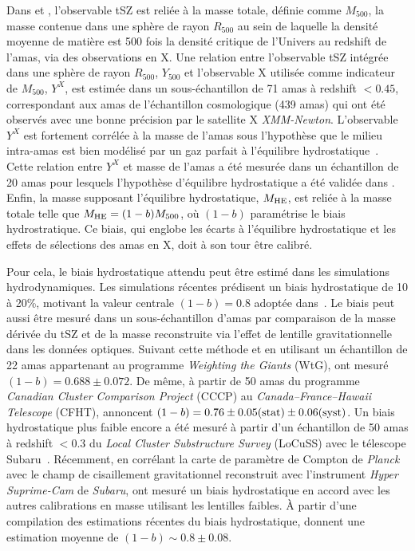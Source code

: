Dans \citet{Planck_2014_SZ_Cosmo} et \citet{Planck_2016_SZ_cosmo},
l'observable tSZ est reliée à la masse totale, définie comme
$M_{500}$, la masse contenue dans une sphère de rayon $R_{500}$ au
sein de laquelle la densité moyenne de matière est 500 fois la
densité critique de l'Univers au redshift de l'amas, via des
observations en X. 
Une relation entre l'observable tSZ intégrée dans une sphère de rayon
$R_{500}$, $Y_{500}$ et l'observable X utilisée comme indicateur de 
$M_{500}$, $Y^{X}$, est estimée dans un sous-échantillon de 71 amas à
redshift $<0.45$, correspondant aux amas de l'échantillon cosmologique
(439 amas) qui ont été observés avec une bonne précision par le satellite
X \emph{XMM-Newton}. L'observable $Y^{X}$ est fortement corrélée à la
masse de l'amas sous l'hypothèse que le milieu intra-amas est bien
modélisé par un gaz parfait à l'équilibre
hydrostatique~\citep{Kravtsov2006}. Cette relation entre $Y^{X}$ et
masse de l'amas a été mesurée dans un échantillon de 20 amas pour lesquels
l'hypothèse d'équilibre hydrostatique a été validée dans \citet{Arnaud2010}.
Enfin, la masse supposant l'équilibre hydrostatique, $M_{\rm{HE}}$,
est reliée à la masse totale telle que $M_{\rm{HE}} = (1-b)M_{500}$,
où $(1-b)$ paramétrise le biais hydrostratique. Ce biais, qui englobe les écarts à
l'équilibre hydrostatique et les effets de sélections des amas en X, doit à son
tour être calibré.

Pour cela, le biais hydrostatique attendu peut être
estimé dans les simulations hydrodynamiques. Les simulations récentes
prédisent un biais hydrostatique de 10 à 20\%, motivant la valeur
centrale $(1 - b) = 0.8$ adoptée dans~\citet{Planck_2014_SZ_Cosmo}. Le
biais peut aussi être mesuré dans un sous-échantillon d'amas par
comparaison de la masse dérivée du tSZ et de la masse reconstruite via
l'effet de lentille gravitationnelle dans les données
optiques. Suivant cette méthode et en utilisant un échantillon de 22
amas appartenant au programme \emph{Weighting the Giants}
(WtG), \citet{vonderLinden2014} ont mesuré $(1-b) = 0.688 \pm
0.072$. De même, à partir de 50 amas du programme \emph{Canadian
Cluster Comparison Project} (CCCP) au \emph{Canada–France–Hawaii
Telescope} (CFHT), \citet{Hoekstra2015} annoncent
$(1-b) = 0.76 \pm 0.05\rm{(stat)} \pm 0.06\rm{(syst)}$. Un biais
hydrostatique plus faible encore a été mesuré à partir d'un
échantillon de 50 amas à redshift $<0.3$ du \emph{Local Cluster
Substructure Survey} (LoCuSS) avec le télescope
Subaru~\citep{Smith2016}. Récemment, en corrélant la carte de
paramètre de Compton de \emph{Planck} avec le champ de cisaillement
gravitationnel reconstruit avec l'instrument \emph{Hyper Suprime-Cam}
de \emph{Subaru}, \citet{Osato2019} ont mesuré un biais hydrostatique
en accord avec les autres calibrations en masse utilisant les lentilles
faibles. \`A partir d'une compilation des estimations récentes 
du biais hydrostatique, \citet{Salvati2018}
donnent une estimation moyenne de $(1-b) \sim 0.8 \pm 0.08$.


